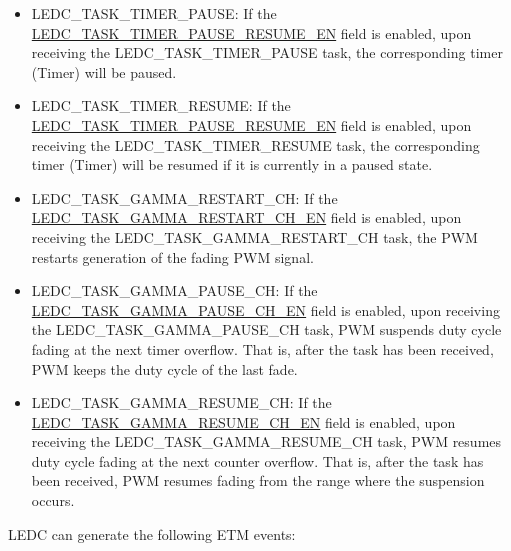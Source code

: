 \documentclass[main\_\_EN.tex]{subfiles}
\begin{document}
\begin{itemize}
\item LEDC\_TASK\_TIMER\_PAUSE: If the \hyperref[fielddesc:LEDCTASKTIMERXPAUSERESUMEEN]{LEDC\_TASK\_TIMER\_PAUSE\_RESUME\_EN} field is enabled, upon receiving the LEDC\_TASK\_TIMER\_PAUSE task, the corresponding timer (Timer) will be paused.
\item LEDC\_TASK\_TIMER\_RESUME: If the \hyperref[fielddesc:LEDCTASKTIMERXPAUSERESUMEEN]{LEDC\_TASK\_TIMER\_PAUSE\_RESUME\_EN} field is enabled, upon receiving the LEDC\_TASK\_TIMER\_RESUME task, the corresponding timer (Timer) will be resumed if it is currently in a paused state.
\item LEDC\_TASK\_GAMMA\_RESTART\_CH: If the \hyperref[fielddesc:LEDCTASKGAMMARESTARTCHNEN]{LEDC\_TASK\_GAMMA\_RESTART\_CH\_EN} field is enabled, upon receiving the LEDC\_TASK\_GAMMA\_RESTART\_CH task, the PWM restarts generation of the fading PWM signal.
\item LEDC\_TASK\_GAMMA\_PAUSE\_CH: If the \hyperref[fielddesc:LEDCTASKGAMMAPAUSECHNEN]{LEDC\_TASK\_GAMMA\_PAUSE\_CH\_EN} field is enabled, upon receiving the LEDC\_TASK\_GAMMA\_PAUSE\_CH task, PWM suspends duty cycle fading at the next timer overflow. That is, after the task has been received, PWM keeps the duty cycle of the last fade.
\item LEDC\_TASK\_GAMMA\_RESUME\_CH: If the \hyperref[fielddesc:LEDCTASKGAMMARESUMECHNEN]{LEDC\_TASK\_GAMMA\_RESUME\_CH\_EN} field is enabled, upon receiving the LEDC\_TASK\_GAMMA\_RESUME\_CH task, PWM resumes duty cycle fading at the next counter overflow. That is, after the task has been received, PWM resumes fading from the range where the suspension occurs.
\end{itemize}

LEDC can generate the following ETM events:
\end{document}
